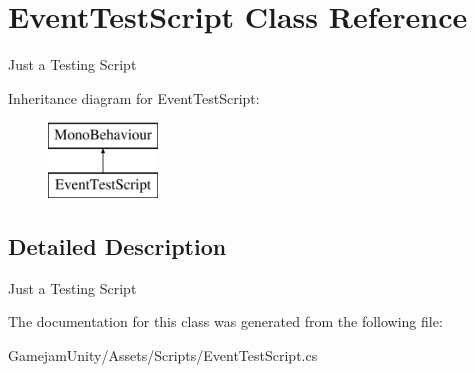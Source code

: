 \hypertarget{class_event_test_script}{}\section{Event\+Test\+Script Class Reference}
\label{class_event_test_script}


Just a Testing Script  


Inheritance diagram for Event\+Test\+Script\+:\begin{figure}[H]
\begin{center}
\leavevmode
\includegraphics[height=2.000000cm]{class_event_test_script}
\end{center}
\end{figure}


\subsection{Detailed Description}
Just a Testing Script 



The documentation for this class was generated from the following file\+:\begin{DoxyCompactItemize}
\item 
Gamejam\+Unity/\+Assets/\+Scripts/Event\+Test\+Script.\+cs\end{DoxyCompactItemize}
